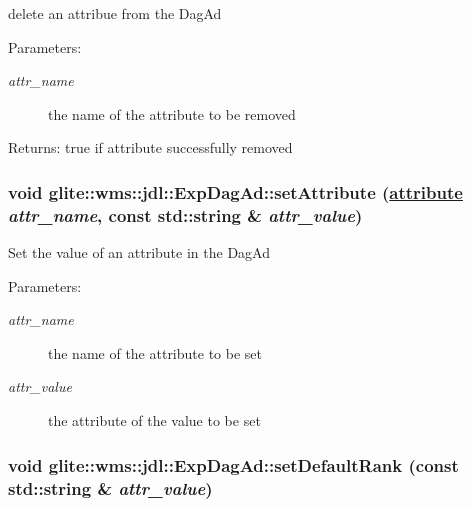 delete an attribue from the Dag\-Ad \begin{Desc}
\item[Parameters:]
\begin{description}
\item[{\em attr\_\-name}]the name of the attribute to be removed \end{description}
\end{Desc}
\begin{Desc}
\item[Returns:]true if attribute successfully removed \end{Desc}
\hypertarget{classglite_1_1wms_1_1jdl_1_1ExpDagAd_a18}{
\subsubsection[setAttribute]{\setlength{\rightskip}{0pt plus 5cm}void glite::wms::jdl::Exp\-Dag\-Ad::set\-Attribute (\hyperlink{classglite_1_1wms_1_1jdl_1_1ExpDagAd_w10}{attribute} {\em attr\_\-name}, const std::string \& {\em attr\_\-value})}}
\label{classglite_1_1wms_1_1jdl_1_1ExpDagAd_a18}


Set the value of an attribute in the Dag\-Ad \begin{Desc}
\item[Parameters:]
\begin{description}
\item[{\em attr\_\-name}]the name of the attribute to be set \item[{\em attr\_\-value}]the attribute of the value to be set \end{description}
\end{Desc}
\hypertarget{classglite_1_1wms_1_1jdl_1_1ExpDagAd_a24}{
\subsubsection[setDefaultRank]{\setlength{\rightskip}{0pt plus 5cm}void glite::wms::jdl::Exp\-Dag\-Ad::set\-Default\-Rank (const std::string \& {\em attr\_\-value})}}
\label{classglite_1_1wms_1_1jdl_1_1ExpDagAd_a24}


